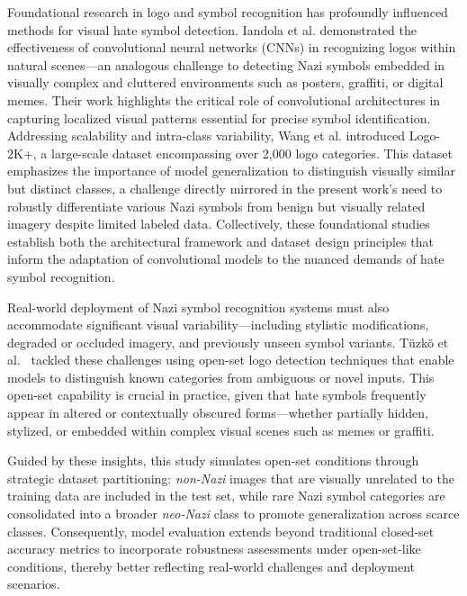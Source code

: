 Foundational research in logo and symbol recognition has profoundly influenced methods for visual hate symbol
detection. Iandola et al.\parencite{iandola2015deeplogo} demonstrated the effectiveness of convolutional neural
networks (\ac{CNN}s) in recognizing logos within natural scenes—an analogous challenge to detecting Nazi symbols
embedded in visually complex and cluttered environments such as posters, graffiti, or digital memes. Their work
highlights the critical role of convolutional architectures in capturing localized visual patterns essential for
precise symbol identification. Addressing scalability and intra-class variability, Wang et al.
\parencite{li2020logo2k} introduced Logo-2K+, a large-scale dataset encompassing over 2,000 logo categories. This
dataset emphasizes the importance of model generalization to distinguish visually similar but distinct classes, a
challenge directly mirrored in the present work’s need to robustly differentiate various Nazi symbols from benign
but visually related imagery despite limited labeled data. Collectively, these foundational studies establish both
the architectural framework and dataset design principles that inform the adaptation of convolutional models to the
nuanced demands of hate symbol recognition.

Real-world deployment of Nazi symbol recognition systems must also accommodate significant visual
variability—including stylistic modifications, degraded or occluded imagery, and previously unseen symbol variants.
Tüzkö et al.~\parencite{tuzko2020open} tackled these challenges using open-set logo detection techniques that enable
models to distinguish known categories from ambiguous or novel inputs. This open-set capability is crucial in
practice, given that hate symbols frequently appear in altered or contextually obscured forms—whether partially
hidden, stylized, or embedded within complex visual scenes such as memes or graffiti.

Guided by these insights, this study simulates open-set conditions through strategic dataset partitioning:
\textit{non-Nazi} images that are visually unrelated to the training data are included in the test set, while rare
Nazi symbol categories are consolidated into a broader \textit{neo-Nazi} class to promote generalization across
scarce classes. Consequently, model evaluation extends beyond traditional closed-set accuracy metrics to
incorporate robustness assessments under open-set-like conditions, thereby better reflecting real-world challenges
and deployment scenarios.

